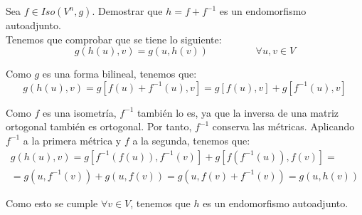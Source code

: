 \begin{ejercicio}
    Sea $f\in Iso(V^n, g)$. Demostrar que $h=f+f^{-1}$ es un endomorfismo autoadjunto.\\

    Tenemos que comprobar que se tiene lo siguiente:
    \begin{equation*}
        g(h(u), v) = g(u, h(v)) \hspace{2cm} \forall u,v\in V
    \end{equation*}

    Como $g$ es una forma bilineal, tenemos que:
    \begin{equation*}
        g(h(u), v) = g[f(u)+f^{-1}(u), v]
        = g[f(u), v] + g[f^{-1}(u), v]
    \end{equation*}

    Como $f$ es una isometría, $f^{-1}$ también lo es, ya que la inversa de una matriz ortogonal también es ortogonal. Por tanto, $f^{-1}$ conserva las métricas. Aplicando $f^{-1}$ a la primera métrica y $f$ a la segunda, tenemos que:
    \begin{multline*}
        g(h(u), v) = g[f^{-1}(f(u)), f^{-1}(v)] + g[f(f^{-1}(u)), f(v)]
        =\\= g(u, f^{-1}(v)) + g(u, f(v))
        = g(u, f(v) + f^{-1}(v))
        = g(u, h(v))
    \end{multline*}

    Como esto se cumple $\forall v\in V$, tenemos que $h$ es un endomorfismo autoadjunto.
    
\end{ejercicio}


